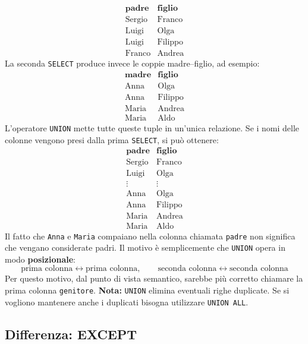 \[
\begin{array}{c|c}
\textbf{padre} & \textbf{figlio} \\ \hline
\text{Sergio} & \text{Franco} \\
\text{Luigi} & \text{Olga} \\
\text{Luigi} & \text{Filippo} \\
\text{Franco} & \text{Andrea}
\end{array}
\]
La seconda \texttt{SELECT} produce invece le coppie madre--figlio, ad
\textcolor{verdeEsempio}{esempio:}
\[
\begin{array}{c|c}
\textbf{madre} & \textbf{figlio} \\ \hline
\text{Anna} & \text{Olga} \\
\text{Anna} & \text{Filippo} \\
\text{Maria} & \text{Andrea} \\
\text{Maria} & \text{Aldo}
\end{array}
\]
L'operatore \texttt{UNION} mette tutte queste tuple in un'unica relazione.
Se i nomi delle colonne vengono presi dalla prima \texttt{SELECT}, si può
ottenere:
\[
\begin{array}{c|c}
\textbf{padre} & \textbf{figlio} \\ \hline
\text{Sergio} & \text{Franco} \\
\text{Luigi} & \text{Olga} \\
\vdots & \vdots \\
\text{Anna} & \text{Olga} \\
\text{Anna} & \text{Filippo} \\
\text{Maria} & \text{Andrea} \\
\text{Maria} & \text{Aldo}
\end{array}
\]
Il fatto che \texttt{Anna} e \texttt{Maria} compaiano nella colonna
chiamata \texttt{padre} non significa che vengano considerate padri.
Il motivo è semplicemente che \texttt{UNION} opera in modo
\textbf{posizionale}:
\[
\boxed{
\text{prima  colonna} \leftrightarrow \text{prima colonna},
\qquad
\text{seconda colonna} \leftrightarrow \text{seconda colonna}
}
\]
Per questo motivo, dal punto di vista semantico, sarebbe più corretto
chiamare la prima colonna \texttt{genitore}.
\medskip
\noindent
\textbf{Nota:} \texttt{UNION} elimina eventuali righe duplicate.
Se si vogliono mantenere anche i duplicati bisogna utilizzare
\texttt{UNION ALL}.

\subsection{Differenza: EXCEPT}

